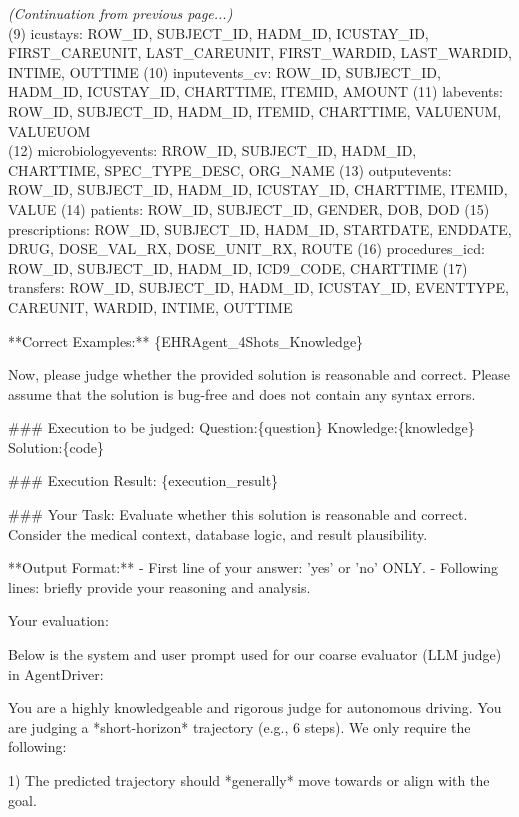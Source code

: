 \documentclass[11pt]{article}
\theoremstyle{plain}
\theoremstyle{definition}
\begin{document}
{\begin{tcolorbox}[systembox]
\textit{(Continuation from previous page...)}\\
(9) icustays: ROW\_ID, SUBJECT\_ID, HADM\_ID, ICUSTAY\_ID, FIRST\_CAREUNIT, LAST\_CAREUNIT, FIRST\_WARDID, LAST\_WARDID, INTIME, OUTTIME
(10) inputevents\_cv: ROW\_ID, SUBJECT\_ID, HADM\_ID, ICUSTAY\_ID, CHARTTIME, ITEMID, AMOUNT
(11) labevents: ROW\_ID, SUBJECT\_ID, HADM\_ID, ITEMID, CHARTTIME, VALUENUM, VALUEUOM\\
(12) microbiologyevents: RROW\_ID, SUBJECT\_ID, HADM\_ID, CHARTTIME, SPEC\_TYPE\_DESC, ORG\_NAME
(13) outputevents: ROW\_ID, SUBJECT\_ID, HADM\_ID, ICUSTAY\_ID, CHARTTIME, ITEMID, VALUE
(14) patients: ROW\_ID, SUBJECT\_ID, GENDER, DOB, DOD
(15) prescriptions: ROW\_ID, SUBJECT\_ID, HADM\_ID, STARTDATE, ENDDATE, DRUG, DOSE\_VAL\_RX, DOSE\_UNIT\_RX, ROUTE
(16) procedures\_icd: ROW\_ID, SUBJECT\_ID, HADM\_ID, ICD9\_CODE, CHARTTIME
(17) transfers: ROW\_ID, SUBJECT\_ID, HADM\_ID, ICUSTAY\_ID, EVENTTYPE, CAREUNIT, WARDID, INTIME, OUTTIME

**Correct Examples:**
\{EHRAgent\_4Shots\_Knowledge\}


Now, please judge whether the provided solution is reasonable and correct. Please assume that the solution is bug-free and does not contain any syntax errors.

\#\#\# Execution to be judged:
Question:\{question\}
Knowledge:\{knowledge\}
Solution:\{code\}

\#\#\# Execution Result:
\{execution\_result\}

\#\#\# Your Task:
Evaluate whether this solution is reasonable and correct. Consider the medical context, database logic, and result plausibility. 

**Output Format:**
- First line of your answer: 'yes' or 'no' ONLY.
- Following lines: briefly provide your reasoning and analysis.

Your evaluation:
\end{tcolorbox}

Below is the system and user prompt used for our coarse evaluator (LLM judge) in AgentDriver:

\begin{tcolorbox}[systembox]
You are a highly knowledgeable and rigorous judge for autonomous driving. You are judging a *short-horizon* trajectory (e.g., 6 steps). We only require the following:

1) The predicted trajectory should *generally* move towards or align with the goal.


\end{tcolorbox}}
\end{document}
